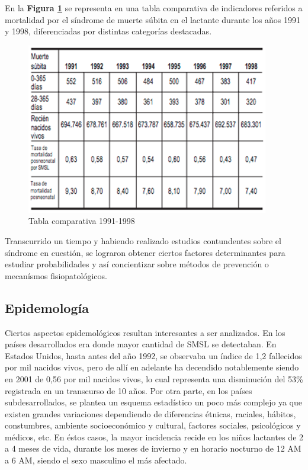 \documentclass{IEEEtran}
\begin{document}
			En la \textbf{Figura \ref{tablahistoria}} se representa en una tabla comparativa de indicadores referidos a mortalidad por el síndrome de muerte súbita en el lactante durante los años 1991 y 1998, diferenciadas por distintas categorías destacadas.

			\begin{figure}
				\centering
				\includegraphics[width=1\linewidth]{tablahistoria}
				\caption{Tabla comparativa 1991-1998}
				\label{tablahistoria}
			\end{figure}

			Transcurrido un tiempo y habiendo realizado estudios contundentes sobre el síndrome en cuestión, se lograron obtener ciertos factores determinantes para estudiar probabilidades y así concientizar sobre métodos de prevención o mecanísmos fisiopatológicos. 

		\subsection{Epidemología}

			Ciertos aspectos epidemológicos resultan interesantes a ser analizados. En los países desarrollados era donde mayor cantidad de SMSL se detectaban. En Estados Unidos, hasta antes del año 1992, se observaba un índice de 1,2 fallecidos por mil nacidos vivos, pero de allí en adelante ha decendido notablemente siendo en 2001 de 0,56 por mil nacidos vivos, lo cual representa una disminución del 53\% registrada en un transcurso de 10 años. Por otra parte, en los países subdesarrollados, se plantea un esquema estadístico un poco más complejo ya que existen grandes variaciones dependiendo de diferencias étnicas, raciales, hábitos, constumbres, ambiente socioeconómico y cultural, factores sociales, psicológicos y médicos, etc. En éstos casos, la mayor incidencia recide en los niños lactantes de 2 a 4 meses de vida, durante los meses de invierno y en horario nocturno de 12 AM a 6 AM, siendo el sexo masculino el más afectado.
\end{document}
